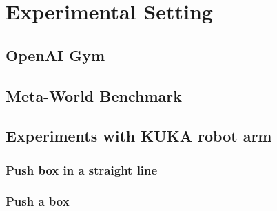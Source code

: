 \chapter{Experimental Setting}
\label{chapter:Experimental Setting}

\section{OpenAI Gym}
\label{section:OpenAI Gym}

\section{Meta-World Benchmark}
\label{section:Meta-World Benchmark}

\section{Experiments with KUKA robot arm}
\label{section:Experiments with KUKA robot arm}

\subsection{Push box in a straight line}
\label{subsection:Push box in a straight line}


\subsection{Push a box}
\label{subsection:Park a box}